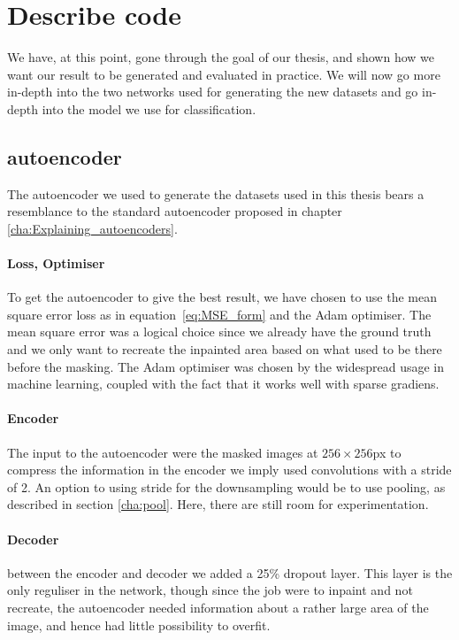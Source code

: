 


\FloatBarrier
\section{Describe code}
We have, at this point, gone through the goal of our thesis, and shown how we want our result to be generated and evaluated in practice. 
We will now go more in-depth into the two networks used for generating the new datasets and go in-depth into the model we use for classification.


\subsection{autoencoder}
The autoencoder we used to generate the datasets used in this thesis bears a resemblance to the standard autoencoder proposed in chapter \ref{cha:Explaining_autoencoders}.

\paragraph{Loss, Optimiser}
To get the autoencoder to give the best result, we have chosen to use the mean square error loss as in equation~\ref{eq:MSE_form} and the Adam\cite{adam} optimiser.
The mean square error was a logical choice since we already have the ground truth and we only want to recreate the inpainted area based on what used to be there before the masking.
The Adam optimiser was chosen by the widespread usage in machine learning, coupled with the fact that it works well with sparse gradiens.

\paragraph{Encoder}
The input to the autoencoder were the masked images at $256 \times 256$px to compress the information in the encoder we imply used convolutions with a stride of 2. An option to using stride for the downsampling would be to use pooling, as described in section \ref{cha:pool}. Here, there are still room for experimentation.



\paragraph{Decoder}
between the encoder and decoder we added a 25\% dropout layer. This layer is the only reguliser in the network, though since the job were to inpaint and not recreate, the autoencoder needed information about a rather large area of the image, and hence had little possibility to overfit.

